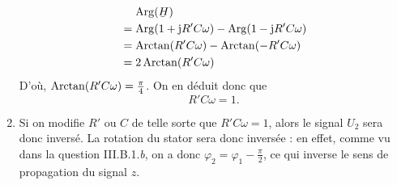 \documentclass[a4paper]{article}
\begin{document}
\begin{multicols}{2}
\begin{enumerate}[label=({\it\alph*\/})]
				\begin{align*}
					&\mathrel{\phantom=} \Arg(\ubar{H})\\
					&= \Arg(1+\mathrm{j}R'C\omega) - \Arg(1 - \mathrm{j}R'C\omega)\\
					&= \Arctan(R'C\omega) - \Arctan(-R'C\omega) \\
					&= 2\Arctan(R'C\omega)\\
				\end{align*}
				D'où, $\operatorname{Arctan}(R'C\omega) = \frac{\pi}{4}$. On en déduit donc que \[
					R' C \omega = 1
				.\]
			\item Si on modifie $R'$\/ ou $C$\/ de telle sorte que $R' C \omega = 1$, alors le signal $U_2$\/ sera donc inversé. La rotation du stator sera donc inversée : en effet, comme vu dans la question III.B.1.\textit b, on a donc $\varphi_2 = \varphi_1 - \frac{\pi}{2}$, ce qui inverse le sens de propagation du signal $z$.
		\end{enumerate}
	\end{multicols}
\end{document}
